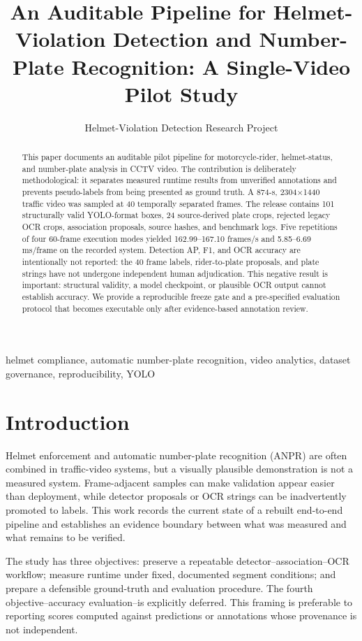 \documentclass[journal]{IEEEtran}
\title{An Auditable Pipeline for Helmet-Violation Detection and Number-Plate Recognition: A Single-Video Pilot Study}
\author{Helmet-Violation Detection Research Project}
\begin{document}
\maketitle
\begin{abstract}
This paper documents an auditable pilot pipeline for motorcycle-rider, helmet-status, and number-plate analysis in CCTV video. The contribution is deliberately methodological: it separates measured runtime results from unverified annotations and prevents pseudo-labels from being presented as ground truth. A 874-s, 2304$\times$1440 traffic video was sampled at 40 temporally separated frames. The release contains 101 structurally valid YOLO-format boxes, 24 source-derived plate crops, rejected legacy OCR crops, association proposals, source hashes, and benchmark logs. Five repetitions of four 60-frame execution modes yielded 162.99--167.10 frames/s and 5.85--6.69 ms/frame on the recorded system. Detection AP, F1, and OCR accuracy are intentionally not reported: the 40 frame labels, rider-to-plate proposals, and plate strings have not undergone independent human adjudication. This negative result is important: structural validity, a model checkpoint, or plausible OCR output cannot establish accuracy. We provide a reproducible freeze gate and a pre-specified evaluation protocol that becomes executable only after evidence-based annotation review.
\end{abstract}
\begin{IEEEkeywords}helmet compliance, automatic number-plate recognition, video analytics, dataset governance, reproducibility, YOLO\end{IEEEkeywords}

\section{Introduction}
Helmet enforcement and automatic number-plate recognition (ANPR) are often combined in traffic-video systems, but a visually plausible demonstration is not a measured system. Frame-adjacent samples can make validation appear easier than deployment, while detector proposals or OCR strings can be inadvertently promoted to labels. This work records the current state of a rebuilt end-to-end pipeline and establishes an evidence boundary between what was measured and what remains to be verified.

The study has three objectives: preserve a repeatable detector--association--OCR workflow; measure runtime under fixed, documented segment conditions; and prepare a defensible ground-truth and evaluation procedure. The fourth objective--accuracy evaluation--is explicitly deferred. This framing is preferable to reporting scores computed against predictions or annotations whose provenance is not independent.
\end{document}
